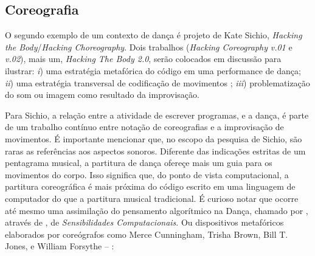 \subsection{Coreografia}\label{sec:coreografia}

O segundo exemplo de um contexto de dança é projeto de Kate Sichio, \emph{Hacking the Body}/\emph{Hacking Choreography}. Dois trabalhos (\emph{Hacking Coreography} \emph{v.01} e \emph{v.02}), mais um, \emph{Hacking The Body 2.0}, serão colocados em discussão para ilustrar: \emph{i}) uma estratégia metafórica do código em uma performance de dança; \emph{ii}) uma estratégia transversal  de codificação de movimentos ; \emph{iii}) problematização do som ou imagem como resultado da improvisação.

Para Sichio, a relação entre a atividade de escrever programas, e a dança, é parte de um trabalho contínuo entre notação de coreografias e a improvisação de movimentos. É importante mencionar que, no escopo da pesquisa de Sichio, são raras as referências aos aspectos sonoros. Diferente das indicações estritas de um pentagrama musical, a partitura de dança ofereçe mais um guia para os movimentos do corpo. Isso significa que, do ponto de vista computacional, a partitura coreográfica é mais próxima do código escrito em uma linguagem de computador do que a partitura musical tradicional. É curioso notar que ocorre até mesmo uma assimilação do pensamento algorítmico na Dança, chamado por , através de , de \emph{Sensibilidades Computacionais}. Ou dispositivos metafóricos elaborados por coreógrafos como Merce Cunningham, Trisha Brown, Bill T. Jones, e William Forsythe --  \cite[cap.~1, p.~2--4]{downie_choreography_2005}:

